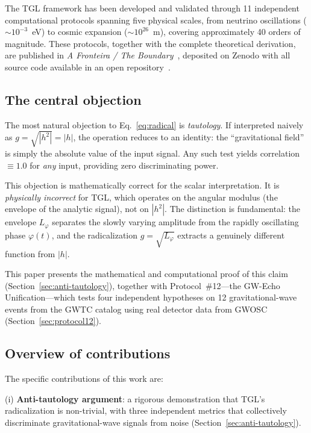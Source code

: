 \documentclass[12pt,a4paper,twocolumn]{article}
\begin{document}
The TGL framework has been developed and validated through 11 independent computational protocols spanning five physical scales, from neutrino oscillations ($\sim 10^{-3}$~eV) to cosmic expansion ($\sim 10^{26}$~m), covering approximately 40 orders of magnitude. These protocols, together with the complete theoretical derivation, are published in \textit{A Fronteira / The Boundary}~\cite{Miguel2026Fronteira}, deposited on Zenodo with all source code available in an open repository~\cite{Miguel2026GitHub}.

\subsection{The central objection}

The most natural objection to Eq.~\eqref{eq:radical} is \emph{tautology}. If interpreted naively as $g = \sqrt{|h^2|} = |h|$, the operation reduces to an identity: the ``gravitational field'' is simply the absolute value of the input signal. Any such test yields correlation $\equiv 1.0$ for \emph{any} input, providing zero discriminating power.

This objection is mathematically correct for the scalar interpretation. It is \emph{physically incorrect} for TGL, which operates on the angular modulus (the envelope of the analytic signal), not on $|h^2|$. The distinction is fundamental: the envelope $L_\varphi$ separates the slowly varying amplitude from the rapidly oscillating phase $\varphi(t)$, and the radicalization $g = \sqrt{L_\varphi}$ extracts a genuinely different function from $|h|$.

This paper presents the mathematical and computational proof of this claim (Section~\ref{sec:anti-tautology}), together with Protocol~\#12---the GW-Echo Unification---which tests four independent hypotheses on 12 gravitational-wave events from the GWTC catalog using real detector data from GWOSC (Section~\ref{sec:protocol12}).

\subsection{Overview of contributions}

The specific contributions of this work are:

(i) \textbf{Anti-tautology argument}: a rigorous demonstration that TGL's radicalization is non-trivial, with three independent metrics that collectively discriminate gravitational-wave signals from noise (Section~\ref{sec:anti-tautology}).
\end{document}
